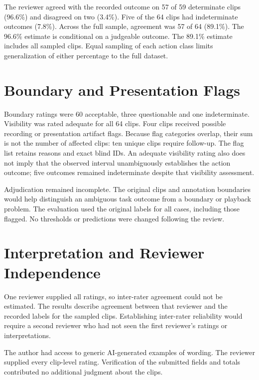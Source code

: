 The reviewer agreed with the recorded outcome on 57 of 59 determinate clips (96.6\%) and
disagreed on two (3.4\%). Five of the 64 clips had indeterminate outcomes (7.8\%).
Across the full sample, agreement was 57 of 64 (89.1\%). The 96.6\% estimate is
conditional on a judgeable outcome. The 89.1\% estimate includes all sampled clips.
Equal sampling of each action class limits generalization of either percentage to the
full dataset.

\section{Boundary and Presentation Flags}

Boundary ratings were 60 acceptable, three questionable and one indeterminate.
Visibility was rated adequate for all 64 clips. Four clips received possible recording
or presentation artifact flags. Because flag categories overlap, their sum is not the
number of affected clips: ten unique clips require follow-up. The flag list retains
reasons and exact blind IDs. An adequate visibility rating also does not imply that the
observed interval unambiguously establishes the action outcome; five outcomes remained
indeterminate despite that visibility assessment.

Adjudication remained incomplete. The original clips and annotation boundaries would
help distinguish an ambiguous task outcome from a boundary or playback problem. The
evaluation used the original labels for all cases, including those flagged. No
thresholds or predictions were changed following the review.

\section{Interpretation and Reviewer Independence}

One reviewer supplied all ratings, so inter-rater agreement could not be estimated. The
results describe agreement between that reviewer and the recorded labels for the sampled
clips. Establishing inter-rater reliability would require a second reviewer who had not
seen the first reviewer's ratings or interpretations.

The author had access to generic AI-generated examples of wording. The reviewer supplied
every clip-level rating. Verification of the submitted fields and totals contributed no
additional judgment about the clips.
